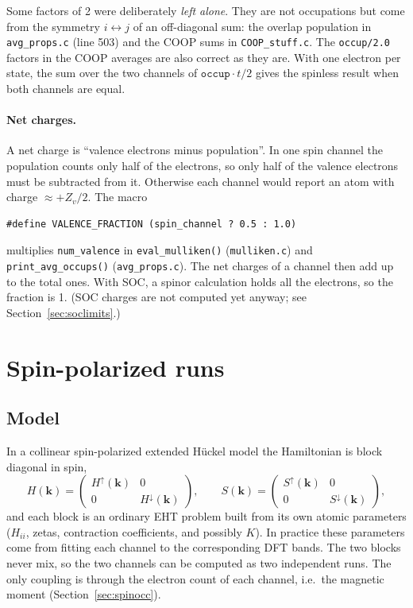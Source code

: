 \documentclass[11pt,a4paper]{article}
\newcommand{\file}[1]{\texttt{#1}}
\newcommand{\fn}[1]{\texttt{#1()}}
\newcommand{\var}[1]{\texttt{#1}}
\begin{document}
Some factors of 2 were deliberately \emph{left alone}. They are not occupations but
come from the symmetry $i\leftrightarrow j$ of an off-diagonal sum: the overlap
population in \file{avg\_props.c} (line 503) and the COOP sums in \file{COOP\_stuff.c}.
The \texttt{occup/2.0} factors in the COOP averages are also correct as they are. With
one electron per state, the sum over the two channels of $\texttt{occup}\cdot
t/2$ gives the spinless result when both channels are equal.

\paragraph{Net charges.} A net charge is ``valence electrons minus population''. In one
spin channel the population counts only half of the electrons, so only half of the
valence electrons must be subtracted from it. Otherwise each channel would report an atom
with charge $\approx +Z_v/2$. The macro
\begin{lstlisting}
#define VALENCE_FRACTION (spin_channel ? 0.5 : 1.0)
\end{lstlisting}
multiplies \var{num\_valence} in \fn{eval\_mulliken} (\file{mulliken.c}) and
\fn{print\_avg\_occups} (\file{avg\_props.c}). The net charges of a channel then add up to
the total ones. With SOC, a spinor calculation holds all the electrons, so the fraction is
1. (SOC charges are not computed yet anyway; see Section~\ref{sec:soclimits}.)

\section{Spin-polarized runs}\label{sec:spin}

\subsection{Model}

In a collinear spin-polarized extended Hückel model the Hamiltonian is block diagonal in
spin,
\begin{equation}
H(\mathbf{k}) = \begin{pmatrix} H^{\uparrow}(\mathbf{k}) & 0 \\ 0 & H^{\downarrow}(\mathbf{k})\end{pmatrix},
\qquad
S(\mathbf{k}) = \begin{pmatrix} S^{\uparrow}(\mathbf{k}) & 0 \\ 0 & S^{\downarrow}(\mathbf{k})\end{pmatrix},
\end{equation}
and each block is an ordinary EHT problem built from its own atomic parameters ($H_{ii}$,
zetas, contraction coefficients, and possibly $K$). In practice these parameters come
from fitting each channel to the corresponding DFT bands. The two blocks never mix, so the
two channels can be computed as two independent runs. The only coupling is through the
electron count of each channel, i.e.\ the magnetic moment (Section~\ref{sec:spinocc}).
\end{document}
